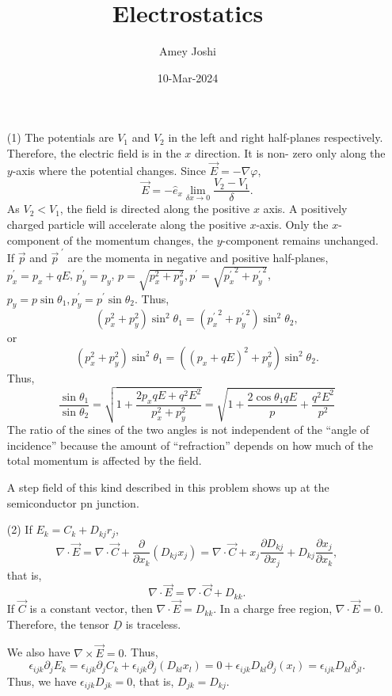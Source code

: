 \documentclass{article}
\title{Electrostatics}\label{c3}
\author{Amey Joshi}
\date{10-Mar-2024}
\newcommand{\uv}[1]{\hat{e}_{#1}}
\newcommand{\grad}[1]{\nabla{#1}}
\newcommand{\dive}[1]{\nabla\cdot\vec{#1}}
\newcommand{\curl}[1]{\nabla\times\vec{#1}}
\newcommand{\op}{\prime}
\newcommand{\pdt}[2]{\frac{\partial{#1}}{\partial{#2}}}
\begin{document}
\maketitle
\begin{enumerate}
\item[(1)] The potentials are $V_1$ and $V_2$ in the left and right half-planes
respectively. Therefore, the electric field is in the $x$ direction. It is non-
zero only along the $y$-axis where the potential changes. Since $\vec{E} = 
-\grad\varphi$,
\[
\vec{E} = -\uv{x}\lim_{\delta x \rightarrow 0}\frac{V_2 - V_1}{\delta}.
\]
As $V_2 < V_1$, the field is directed along the positive $x$ axis. A positively
charged particle will accelerate along the positive $x$-axis. Only the $x$-
component of the momentum changes, the $y$-component remains unchanged. If $\vec{p}$
and $\vec{p}^{\;\op}$ are the momenta in negative and positive half-planes, $p_x^\op = 
p_x + qE$, $p_y^\op = p_y$, $p = \sqrt{p_x^2 + p_y^2}, p^\op = \sqrt{{p_x^\op}^2
+ {p_y^\op}^2}$, $p_y = p\sin\theta_1, p_y^\op = p^\op\sin\theta_2$. Thus,
\[
(p_x^2 + p_y^2)\sin^2\theta_1 = ({p_x^\op}^2 + {p_y^\op}^2)\sin^2\theta_2,
\]
or
\[
(p_x^2 + p_y^2)\sin^2\theta_1 = ((p_x + qE)^2 + p_y^2)\sin^2\theta_2.
\]
Thus,
\begin{equation}\label{e1}
\frac{\sin\theta_1}{\sin\theta_2} = 
\sqrt{1 + \frac{2p_xqE + q^2E^2}{p_x^2 + p_y^2}} =
\sqrt{1 + \frac{2\cos\theta_1 qE}{p} + \frac{q^2E^2}{p^2}}
\end{equation}
The ratio of the sines of the two angles is not independent of the ``angle of
incidence'' because the amount of ``refraction'' depends on how much of the
total momentum is affected by the field.

A step field of this kind described in this problem shows up at the semiconductor
pn junction.

\item[(2)] If $E_k = C_k + D_{kj}r_j$,
\[
\dive{E} = \dive{C} + \frac{\partial}{\partial x_k}(D_{kj}x_j) = \dive{C} +
x_j\pdt{D_{kj}}{x_j} + D_{kj}\pdt{x_j}{x_k},
\]
that is,
\[
\dive{E} = \dive{C} + D_{kk}.
\]
If $\vec{C}$ is a constant vector, then $\dive{E} = D_{kk}$. In a charge free
region, $\dive{E} = 0$. Therefore, the tensor $\underline{D}$ is traceless.

We also have $\curl{E} = 0$. Thus,
\[
\epsilon_{ijk}\partial_jE_k = \epsilon_{ijk}\partial_jC_k + \epsilon_{ijk}\partial_j(D_{kl}x_l)
= 0 + \epsilon_{ijk}D_{kl}\partial_j(x_l) = \epsilon_{ijk}D_{kl}\delta_{jl}.
\]
Thus, we have $\epsilon_{ijk}D_{jk} = 0$, that is, $D_{jk} = D_{kj}$.


\end{enumerate}
\end{document}
